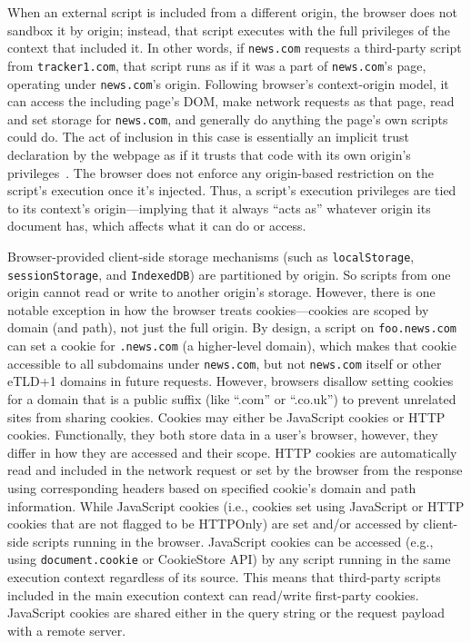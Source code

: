 %
When an external script is included from a different origin, the browser does not sandbox it by origin; instead, that script executes with the full privileges of the context that included it.
%
In other words, if \texttt{news.com} requests a third-party script from \texttt{tracker1.com}, that script runs as if it was a part of \texttt{news.com}’s page, operating under \texttt{news.com}’s origin.
%
Following browser's context-origin model, it can access the including page’s DOM, make network requests as that page, read and set storage for \texttt{news.com}, and generally do anything the page’s own scripts could do.
%
The act of inclusion in this case is essentially an implicit trust declaration by the webpage as if it trusts that code with its own origin’s privileges~\cite{TrackingPreventionWebKit2020}.
%
The browser does not enforce any origin-based restriction on the script’s execution once it’s injected.
%
Thus, a script's execution privileges are tied to its context’s origin---implying that it always ``acts as'' whatever origin its document has, which affects what it can do or access.


%
Browser-provided client-side storage mechanisms (such as \texttt{localStorage}, \texttt{sessionStorage}, and \texttt{IndexedDB}) are partitioned by origin.
%
So scripts from one origin cannot read or write to another origin’s storage.
%
However, there is one notable exception in how the browser treats cookies---cookies are scoped by domain (and path), not just the full origin.
%
By design, a script on \texttt{foo.news.com} can set a cookie for \texttt{.news.com} (a higher-level domain), which makes that cookie accessible to all subdomains under \texttt{news.com}, but not \texttt{news.com} itself or other eTLD+1 domains in future requests.
%
However, browsers disallow setting cookies for a domain that is a public suffix (like ``.com'' or ``.co.uk'') to prevent unrelated sites from sharing cookies.
%
Cookies may either be JavaScript cookies or HTTP cookies.
%
Functionally, they both store data in a user's browser, however, they differ in how they are accessed and their scope.
%
HTTP cookies are automatically read and included in the network request or set by the browser from the response using corresponding headers based on specified cookie's domain and path information.
%
While JavaScript cookies (i.e., cookies set using JavaScript or HTTP cookies that are not flagged to be HTTPOnly) are set and/or accessed by client-side scripts running in the browser.
%
JavaScript cookies can be accessed (e.g., using \texttt{document.cookie} or CookieStore API) by any script running in the same execution context regardless of its source.
%
This means that third-party scripts included in the main execution context can read/write first-party cookies.
%
JavaScript cookies are shared either in the query string or the request payload with a remote server.



